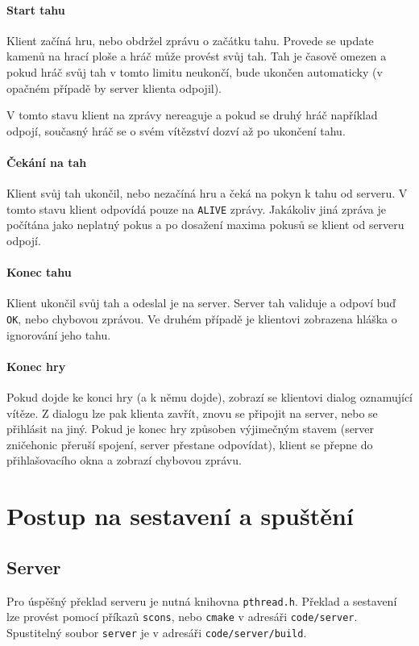 \documentclass[11pt,a4paper]{scrartcl}
\begin{document}
	\paragraph{Start tahu}
	Klient začíná hru, nebo obdržel zprávu o začátku tahu. Provede se update kamenů na hrací ploše a hráč může provést svůj tah. Tah je časově omezen a pokud hráč svůj tah v tomto limitu neukončí, bude ukončen automaticky (v opačném případě by server klienta odpojil).
	
	V tomto stavu klient na zprávy nereaguje a pokud se druhý hráč například odpojí, současný hráč se o svém vítězství dozví až po ukončení tahu.
	
	\paragraph{Čekání na tah}
	Klient svůj tah ukončil, nebo nezačíná hru a čeká na pokyn k tahu od serveru. V tomto stavu klient odpovídá pouze na \verb|ALIVE| zprávy. Jakákoliv jiná zpráva je počítána jako neplatný pokus a po dosažení maxima pokusů se klient od serveru odpojí.
	
	\paragraph{Konec tahu}
	Klient ukončil svůj tah a odeslal je na server. Server tah validuje a odpoví buď \verb|OK|,  nebo chybovou zprávou. Ve druhém případě je klientovi zobrazena hláška o ignorování jeho tahu. 
	
	\paragraph{Konec hry}
	Pokud dojde ke konci hry (a k němu dojde), zobrazí se klientovi dialog oznamující vítěze. Z dialogu lze pak klienta zavřít, znovu se připojit na server, nebo se přihlásit na jiný. Pokud je konec hry způsoben výjimečným stavem (server zničehonic přeruší spojení, server přestane odpovídat), klient se přepne do přihlašovacího okna a zobrazí chybovou zprávu.
	

		
	\section{Postup na sestavení a spuštění}
	\subsection{Server}
	Pro úspěšný překlad serveru je nutná knihovna \verb|pthread.h|. Překlad a sestavení lze provést pomocí příkazů \verb|scons|, nebo \verb|cmake| v adresáři \verb|code/server|. Spustitelný soubor \verb|server| je v adresáři \verb|code/server/build|.
\end{document}
